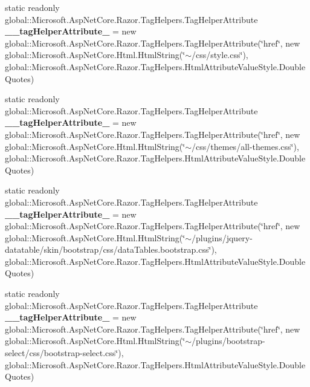 \begin{DoxyCompactItemize}
\item 
\mbox{\label{class_asp_net_core_1_1_views___shared____head_a8f132910da59b5519aa1f52a5b841bd9}} 
static readonly global\+::\+Microsoft.\+Asp\+Net\+Core.\+Razor.\+Tag\+Helpers.\+Tag\+Helper\+Attribute {\bfseries \+\_\+\+\_\+tag\+Helper\+Attribute\+\_} = new global\+::\+Microsoft.\+Asp\+Net\+Core.\+Razor.\+Tag\+Helpers.\+Tag\+Helper\+Attribute(\char`\"{}href\char`\"{}, new global\+::\+Microsoft.\+Asp\+Net\+Core.\+Html.\+Html\+String(\char`\"{}$\sim$/css/style.\+css\char`\"{}), global\+::\+Microsoft.\+Asp\+Net\+Core.\+Razor.\+Tag\+Helpers.\+Html\+Attribute\+Value\+Style.\+Double\+Quotes)
\item 
\mbox{\label{class_asp_net_core_1_1_views___shared____head_a230296f129014c7947a14468f86d5c6f}} 
static readonly global\+::\+Microsoft.\+Asp\+Net\+Core.\+Razor.\+Tag\+Helpers.\+Tag\+Helper\+Attribute {\bfseries \+\_\+\+\_\+tag\+Helper\+Attribute\+\_} = new global\+::\+Microsoft.\+Asp\+Net\+Core.\+Razor.\+Tag\+Helpers.\+Tag\+Helper\+Attribute(\char`\"{}href\char`\"{}, new global\+::\+Microsoft.\+Asp\+Net\+Core.\+Html.\+Html\+String(\char`\"{}$\sim$/css/themes/all-\/themes.\+css\char`\"{}), global\+::\+Microsoft.\+Asp\+Net\+Core.\+Razor.\+Tag\+Helpers.\+Html\+Attribute\+Value\+Style.\+Double\+Quotes)
\item 
\mbox{\label{class_asp_net_core_1_1_views___shared____head_a3c9e3347a8edfb605c05f079d8af4b38}} 
static readonly global\+::\+Microsoft.\+Asp\+Net\+Core.\+Razor.\+Tag\+Helpers.\+Tag\+Helper\+Attribute {\bfseries \+\_\+\+\_\+tag\+Helper\+Attribute\+\_} = new global\+::\+Microsoft.\+Asp\+Net\+Core.\+Razor.\+Tag\+Helpers.\+Tag\+Helper\+Attribute(\char`\"{}href\char`\"{}, new global\+::\+Microsoft.\+Asp\+Net\+Core.\+Html.\+Html\+String(\char`\"{}$\sim$/plugins/jquery-\/datatable/skin/bootstrap/css/data\+Tables.\+bootstrap.\+css\char`\"{}), global\+::\+Microsoft.\+Asp\+Net\+Core.\+Razor.\+Tag\+Helpers.\+Html\+Attribute\+Value\+Style.\+Double\+Quotes)
\item 
\mbox{\label{class_asp_net_core_1_1_views___shared____head_a072a7546ff98c7599ec515caca3c96b5}} 
static readonly global\+::\+Microsoft.\+Asp\+Net\+Core.\+Razor.\+Tag\+Helpers.\+Tag\+Helper\+Attribute {\bfseries \+\_\+\+\_\+tag\+Helper\+Attribute\+\_} = new global\+::\+Microsoft.\+Asp\+Net\+Core.\+Razor.\+Tag\+Helpers.\+Tag\+Helper\+Attribute(\char`\"{}href\char`\"{}, new global\+::\+Microsoft.\+Asp\+Net\+Core.\+Html.\+Html\+String(\char`\"{}$\sim$/plugins/bootstrap-\/select/css/bootstrap-\/select.\+css\char`\"{}), global\+::\+Microsoft.\+Asp\+Net\+Core.\+Razor.\+Tag\+Helpers.\+Html\+Attribute\+Value\+Style.\+Double\+Quotes)

\end{DoxyCompactItemize}
